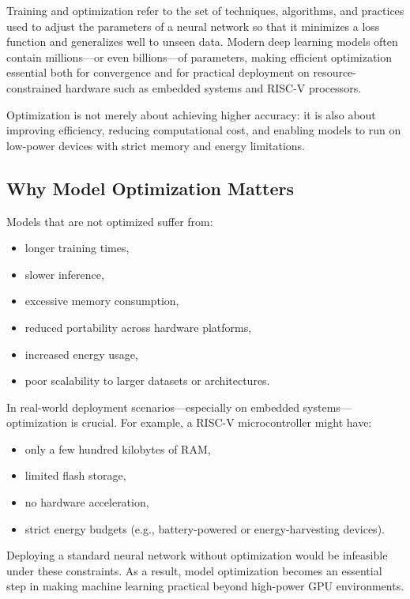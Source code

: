 \documentclass[12pt,a4paper]{report}
\begin{document}
Training and optimization refer to the set of techniques, algorithms, and practices used to adjust the parameters of a neural network so that it minimizes a loss function and generalizes well to unseen data.  
Modern deep learning models often contain millions—or even billions—of parameters, making efficient optimization essential both for convergence and for practical deployment on resource-constrained hardware such as embedded systems and RISC-V processors.

Optimization is not merely about achieving higher accuracy: it is also about improving efficiency, reducing computational cost, and enabling models to run on low-power devices with strict memory and energy limitations.

\vspace{1em}
\subsection{Why Model Optimization Matters}

Models that are not optimized suffer from:
\begin{itemize}
    \item longer training times,
    \item slower inference,
    \item excessive memory consumption,
    \item reduced portability across hardware platforms,
    \item increased energy usage,
    \item poor scalability to larger datasets or architectures.
\end{itemize}

In real-world deployment scenarios—especially on embedded systems—optimization is crucial.  
For example, a RISC-V microcontroller might have:
\begin{itemize}
    \item only a few hundred kilobytes of RAM,
    \item limited flash storage,
    \item no hardware acceleration,
    \item strict energy budgets (e.g., battery-powered or energy-harvesting devices).
\end{itemize}

Deploying a standard neural network without optimization would be infeasible under these constraints.  
As a result, model optimization becomes an essential step in making machine learning practical beyond high-power GPU environments.
\end{document}
